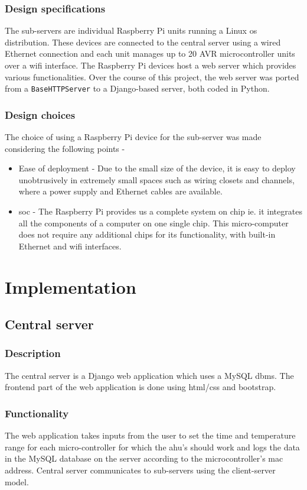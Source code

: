 \documentclass[letterpaper,11pt]{report}
\begin{document}
\subsection{Design specifications}
The sub-servers are individual Raspberry Pi units running a Linux \ac{os} distribution. These devices are connected to the central server using a wired Ethernet connection and each unit manages up to 20 AVR microcontroller units over a \ac{wifi} interface. The Raspberry Pi devices host a web server which provides various functionalities. Over the course of this project, the web server was ported from a \verb|BaseHTTPServer| to a Django-based server, both coded in Python.
\subsection{Design choices}
The choice of using a Raspberry Pi device for the sub-server was made considering the following points -
\begin{itemize}
    \item Ease of deployment - Due to the small size of the device, it is easy to deploy unobtrusively in extremely small spaces such as wiring closets and channels, where a power supply and Ethernet cables are available.
    \item \ac{soc} - The Raspberry Pi provides us a complete system on chip ie. it integrates all the components of a computer on one single chip. This micro-computer does not require any additional chips for its functionality, with built-in Ethernet and \ac{wifi} interfaces.
\end{itemize}

\newpage
\chapter{Implementation}\label{chapter:Implementation}
\onehalfspacing
\section{Central server}
\subsection{Description}
The central server is a Django web application which uses a MySQL \ac{dbms}. The frontend part of the web application is done using \ac{html}/\ac{css} and bootstrap.
\subsection{Functionality}
The web application takes inputs from the user to set the time and temperature range for each micro-controller for which the \ac{ahu}'s should work and logs the data in the MySQL database on the server according to the microcontroller's \ac{mac} address. Central server communicates to sub-servers using the client-server model.
\end{document}
